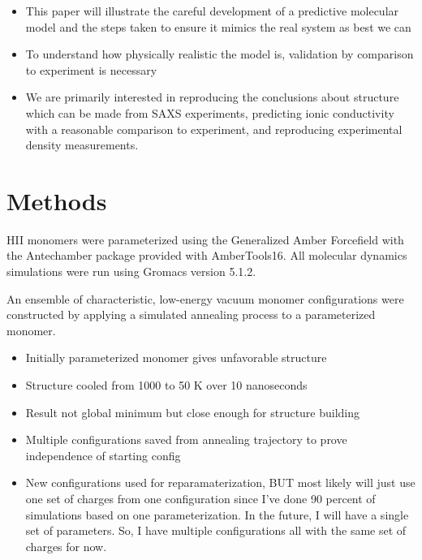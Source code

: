 \documentclass{article}
\begin{document}
    
	\begin{itemize}
		\item This paper will illustrate the careful development of a predictive molecular model and the steps taken to ensure it mimics the real system as best we can 
		\item To understand how physically realistic the model is, validation by comparison to experiment is necessary
		\item We are primarily interested in reproducing the conclusions about structure which can be made from SAXS experiments, predicting ionic conductivity with a reasonable comparison to experiment, and reproducing experimental density measurements.          
	\end{itemize}
	
	\section{Methods}
	
	HII monomers were parameterized using the Generalized Amber Forcefield with the Antechamber package provided with AmberTools16. All molecular dynamics simulations were run using Gromacs version 5.1.2.

	An ensemble of characteristic, low-energy vacuum monomer configurations were constructed by applying a simulated annealing process to a parameterized monomer.
	\begin{itemize}
		\item Initially parameterized monomer gives unfavorable structure %
		\item Structure cooled from 1000 to 50 K over 10 nanoseconds
		\item Result not global minimum but close enough for structure building
		\item Multiple configurations saved from annealing trajectory to prove independence of starting config
		\item New configurations used for reparamaterization, BUT most likely will just use one set of charges from one configuration since I've done 90 percent of simulations based on one parameterization. In the future, I will have a single set of parameters. So, I have multiple configurations all with the same set of charges for now.
	\end{itemize}
\end{document}
